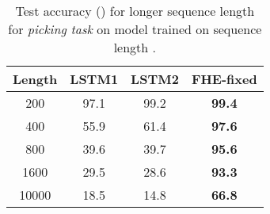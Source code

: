 \begin{table}[t]
\caption{Test accuracy () for longer sequence length for \emph{picking task} on model trained on sequence length \mbox{}.}
\label{table:pickingGeneralization}
\vskip 0.1in
\begin{center}
\begin{small}
\begin{sc}
\begin{tabular}{c || c c | c} 
\toprule
\textbf{Length} & \textbf{LSTM1} & \textbf{LSTM2} & \textbf{FHE-fixed}\\
\midrule
200 & 97.1 & 99.2 & \textbf{99.4}\\
400 & 55.9 & 61.4 & \textbf{97.6}\\
800 & 39.6 & 39.7 & \textbf{95.6}\\
1600 &  29.5 & 28.6  & \textbf{93.3}  \\
10000 &  18.5 & 14.8 & \textbf{66.8} \\
\bottomrule
\end{tabular}
\end{sc}
\end{small}
\end{center}
\vskip -0.25in
\end{table}

